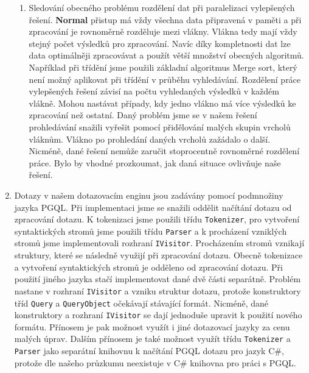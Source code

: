 \begin{enumerate}
\begin{enumerate}
\item 
Sledování obecného problému rozdělení dat při paralelizaci vylepšených řešení. 
\textbf{Normal} přistup má vždy všechna data připravená v paměti a při zpracování je rovnoměrně rozděluje mezi vlákny.
Vlákna tedy mají vždy stejný počet výsledků pro zpracování.
Navíc díky kompletnosti dat lze data optimálněji zpracovávat a použít větší množství obecných algoritmů.
Například při třídění jsme použili základní algoritmus Merge sort, který není možný aplikovat při třídění v průběhu vyhledávání.  
Rozdělení práce vylepšených řešení závisí na počtu vyhledaných výsledků v každém vlákně.
Mohou nastávat případy, kdy jedno vlákno má více výsledků ke zpracování než ostatní. 
Daný problém jsme se v našem řešení prohledávání snažili vyřešit pomocí přidělování malých skupin vrcholů vláknům.
Vlákno po prohledání daných vrcholů zažádalo o další.
Nicméně, dané řešení nemůže zaručit stoprocentně rovnoměrné rozdělení práce.
Bylo by vhodné prozkoumat, jak daná situace ovlivňuje naše řešení.

\end{enumerate}

\item
Dotazy v našem dotazovacím enginu jsou zadávány pomocí podmnožiny jazyka PGQL.
Při implementaci jsme se snažili oddělit načítání dotazu od zpracování dotazu.
K tokenizaci jsme použili třídu \texttt{Tokenizer}, pro vytvoření syntaktických stromů jsme použili třídu \texttt{Parser} a k procházení vzniklých stromů jsme implementovali rozhraní \texttt{IVisitor}.
Procházením stromů vznikají struktury, které se následně využijí při zpracování dotazu.
Obecně tokenizace a vytvoření syntaktických stromů je odděleno od zpracování dotazu.
Při použití jiného jazyka stačí implementovat dané dvě části separátně.
Problém nastane v rozhraní \texttt{IVisitor} a vzniku struktur dotazu, protože konstruktory tříd \texttt{Query} a \texttt{QueryObject} očekávají stávající formát.
Nicméně, dané konstruktory a rozhraní \texttt{IVisitor} se dají jednoduše upravit k použití nového formátu.
Přínosem je pak možnost využít i jiné dotazovací jazyky za cenu malých úprav.
Dalším přínosem je také možnost využít třídu \texttt{Tokenizer} a \texttt{Parser} jako separátní knihovnu k načítání PGQL dotazu pro jazyk C\#, protože dle našeho průzkumu neexistuje v C\# knihovna pro práci s PGQL. 


\end{enumerate}



